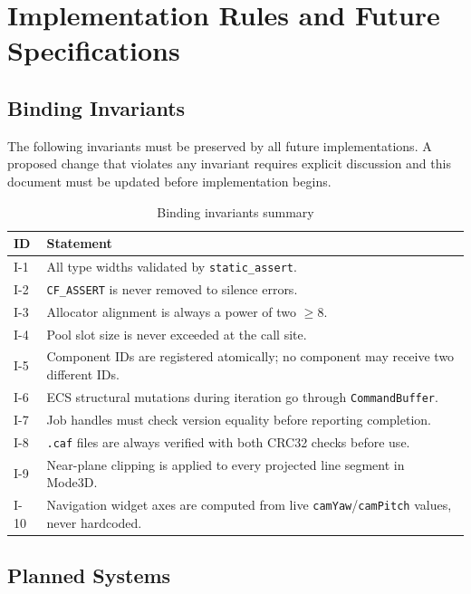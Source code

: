 \chapter{Implementation Rules and Future Specifications}

\section{Binding Invariants}

The following invariants must be preserved by all future implementations.
A proposed change that violates any invariant requires explicit discussion
and this document must be updated before implementation begins.

\begin{table}[H]
\centering
\caption{Binding invariants summary}
\begin{tabular}{lp{9cm}}
\toprule
\textbf{ID} & \textbf{Statement} \\
\midrule
I-1  & All type widths validated by \texttt{static\_assert}. \\
I-2  & \texttt{CF\_ASSERT} is never removed to silence errors. \\
I-3  & Allocator alignment is always a power of two $\geq 8$. \\
I-4  & Pool slot size is never exceeded at the call site. \\
I-5  & Component IDs are registered atomically; no component may receive two different IDs. \\
I-6  & ECS structural mutations during iteration go through \texttt{CommandBuffer}. \\
I-7  & Job handles must check version equality before reporting completion. \\
I-8  & \texttt{.caf} files are always verified with both CRC32 checks before use. \\
I-9  & Near-plane clipping is applied to every projected line segment in Mode3D. \\
I-10 & Navigation widget axes are computed from live \texttt{camYaw}/\texttt{camPitch} values, never hardcoded. \\
\bottomrule
\end{tabular}
\end{table}

\section{Planned Systems}

